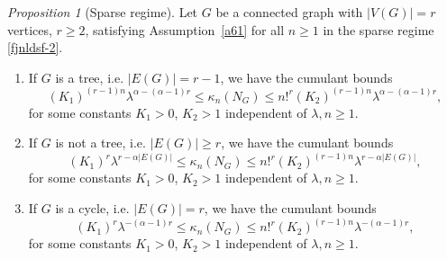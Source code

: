 \documentclass[bj,authoryear,noshowframe]{imsart}
\theoremstyle{plain}
\theoremstyle{remark}
\newtheorem{prop}{Proposition}[section]
\begin{document}
 \begin{prop}[Sparse regime] 
 \label{th6.4}
   Let $G$ be a connected graph with $|V(G)|=r$ vertices, $r\geq 2$,
   satisfying Assumption~\ref{a61} for all $n\geq 1$
   in the sparse regime \eqref{fjnldsf-2}. 
   \begin{enumerate} %
   \item 
  If $G$ is a tree, i.e. $|E(G)| = r-1$, we have the cumulant bounds %
 \begin{equation} 
 \label{cumulant-rhop2-0}
   (K_1)^{(r-1)n}
  \lambda^{\alpha  -(\alpha - 1)r }
      \leq 
   \kappa_n(N_G)
   \leq 
   n!^r
   (K_2)^{(r-1)n} \lambda^{ \alpha     -(\alpha - 1)r       } , 
 \end{equation} 
  for some constants $K_1>0$, $K_2>1$ independent of $\lambda, n\geq 1$.
 \item
  If $G$ is not a tree, i.e. $|E(G)|\geq r$,
  we have the cumulant bounds %
  \begin{equation} 
  \label{cumulant-rhoph1}
   (K_1)^r 
  \lambda^{r-\alpha |E(G)|}
  \leq 
   \kappa_n(N_G)
   \leq
    n!^r
    (K_2)^{(r-1)n}
    \lambda^{r-\alpha |E(G)|}, 
 \end{equation} 
  for some constants $K_1>0$, $K_2>1$ independent of $\lambda, n\geq 1$. 
 \item
   If $G$ is a cycle, i.e. $|E(G)| = r$,
   we have the cumulant bounds %
  \begin{equation} 
 \label{cumulant-rhoph2}
   (K_1)^r 
  \lambda^{- (\alpha - 1 )r}
 \leq 
   \kappa_n(N_G)
   \leq
   n!^r
   (K_2)^{(r-1)n}
     \lambda^{ - (\alpha -1)r}, 
 \end{equation} 
  for some constants $K_1>0$, $K_2>1$ independent of $\lambda, n\geq 1$. 
 \end{enumerate}
 \end{prop}
\end{document}
